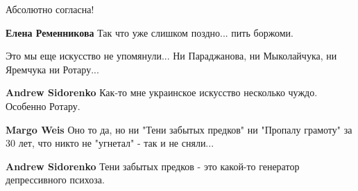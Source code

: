\begin{itemize}
Абсолютно согласна!

\begin{itemize}
 
\textbf{Елена Ременникова} Так что уже слишком поздно... пить боржоми.
\end{itemize}

 

Это мы еще искусство не упомянули... Ни Параджанова, ни Мыколайчука, ни
Яремчука ни Ротару...

\begin{itemize}
 
\textbf{Andrew Sidorenko} Как-то мне украинское искусство несколько чуждо. Особенно Ротару.

 
\textbf{Margo Weis} Оно то да, но ни "Тени забытых предков" ни "Пропалу грамоту" за 30 лет, что никто не "угнетал" - так и не сняли...

 
\textbf{Andrew Sidorenko} Тени забытых предков - это какой-то генератор депрессивного психоза.

 

\end{itemize}
\end{itemize}
